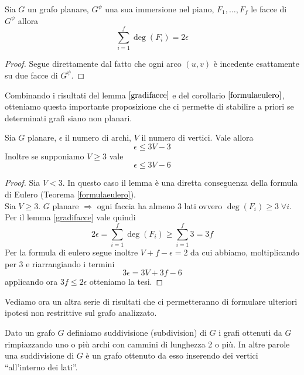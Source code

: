 \begin{lemma}\label{gradifacce}
    Sia \(G\) un grafo planare, \(G^\psi\) una sua immersione nel piano, \(F_1, \dots, F_f\) le facce di \(G^\psi\) allora
    \begin{equation}
        \sum_{i=1}^f \deg(F_i) = 2\epsilon
    \end{equation}
    \begin{proof}
        Segue direttamente dal fatto che ogni arco \((u,v)\) è incedente esattamente su due facce di \(G^\psi\).
    \end{proof}
\end{lemma}
Combinando i risultati del lemma \(\ref{gradifacce}\) e del corollario \(\ref{formulaeulero}\), otteniamo questa importante proposizione che ci permette di stabilire a priori se determinati grafi siano non planari.
\begin{proposizione}\label{criterioNonPlan}
    Sia \(G\) planare, \(\epsilon\) il numero di archi, \(V\) il numero di vertici. Vale allora
    \begin{equation}
        \epsilon \leq 3V - 3
    \end{equation}
    Inoltre se supponiamo \(V \geq 3\) vale
    \begin{equation}
        \epsilon \leq 3V - 6
    \end{equation}
    \begin{proof}
        Sia \(V<3\). In questo caso il lemma è una diretta conseguenza della formula di Eulero (Teorema {\ref{formulaeulero}}). \\
        Sia \(V\geq 3\). \(G\) planare \(\Rightarrow\) ogni faccia ha almeno 3 lati ovvero \(\deg(F_i) \geq 3\; \forall i\). Per il lemma {\ref{gradifacce}} vale quindi
        \begin{equation}
            2\epsilon = \sum_{i=1}^f \deg(F_i) \geq \sum_{i=1}^f 3 = 3f
        \end{equation}
        Per la formula di eulero segue inoltre \(V+f-\epsilon = 2\) da cui abbiamo, moltiplicando per 3 e riarrangiando i termini
        \begin{equation}
            3\epsilon = 3V + 3f - 6
        \end{equation}
        applicando ora \(3f\leq 2 \epsilon\) otteniamo la tesi.
    \end{proof}
\end{proposizione}
Vediamo ora un altra serie di risultati che ci permetteranno di formulare ulteriori ipotesi non restrittive sul grafo analizzato.
\begin{definizione}[Suddivisione]
    Dato un grafo \(G\) definiamo suddivisione (subdivision) di \(G\) i grafi ottenuti da \(G\) rimpiazzando uno o più archi con cammini di lunghezza 2 o più. In altre parole una suddivisione di \(G\) è un grafo ottenuto da esso inserendo dei vertici “all'interno dei lati”.
\end{definizione}
